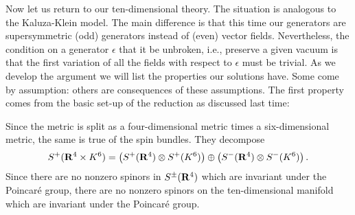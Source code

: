 Now let us return to our ten-dimensional theory. The situation is
analogous to the Kaluza-Klein model.  The main difference is that this
time our generators are supersymmetric (odd) generators instead of
(even) vector fields.  Nevertheless, the condition on a generator
$\epsilon$ that it be unbroken, i.e., preserve a given vacuum is that
the first variation of all the fields with respect to $\epsilon$ must
be trivial.  As we develop the argument we will list the properties
our solutions have.
Some come by assumption: others are consequences of these assumptions.
 The first property comes from the basic set-up of the reduction as
discussed last time:

\smallskip
{}
 
Since the metric is split as a four-dimensional metric
times a six-dimensional metric, the same is true of the spin
bundles. They decompose 
$$S^+({\bf R}^4\times K^6)=\left(S^+({\bf R}^4)\otimes S^+(K^6)\right)\oplus
\left(S^-({\bf R}^4)\otimes S^-(K^6)\right).$$
Since there are no nonzero spinors in $S^\pm({\bf R}^4)$ which are
invariant under the Poincar\'e group, there are no nonzero spinors on
the ten-dimensional manifold which are invariant under the Poincar\'e
group.

\smallskip
{} 

